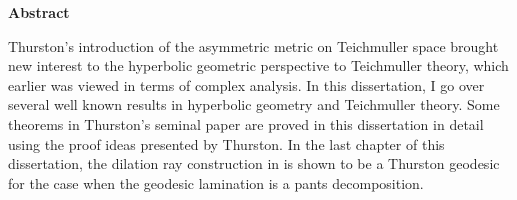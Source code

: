 \documentclass[a4paper, 12pt, twoside]{report}
\theoremstyle{plain}
\theoremstyle{definition}
\theoremstyle{remark}
\begin{document}
\newpage
\begin{center}
    \textbf{\Large Abstract}
\end{center}

Thurston's introduction of the asymmetric metric on Teichmuller space brought new interest to the hyperbolic geometric perspective to Teichmuller theory, which earlier was viewed in terms of complex analysis. In this dissertation, I go over several well known results in hyperbolic geometry and Teichmuller theory. Some theorems in Thurston's seminal paper \cite{thurston} are proved in this dissertation in detail using the proof ideas presented by Thurston. In the last chapter of this dissertation, the dilation ray construction in \cite{farre} is shown to be a Thurston geodesic for the case when the geodesic lamination is a pants decomposition.

\newpage
\restoregeometry

\listoffigures

\newpage
\tableofcontents

\newpage








\end{document}
